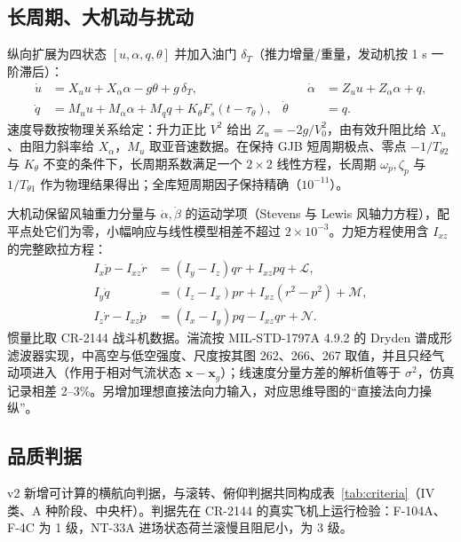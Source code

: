 \documentclass[UTF8,a4paper,11pt,fontset=fandol,scheme=plain]{ctexart}
\begin{document}
\subsection{长周期、大机动与扰动}
纵向扩展为四状态 \([u,\alpha,q,\theta]\) 并加入油门 \(\delta_T\)（推力增量/重量，发动机按 1 s 一阶滞后）：
\begin{equation}
\begin{aligned}
\dot u&=X_uu+X_\alpha\alpha-g\theta+g\,\delta_T, &\qquad \dot\alpha&=Z_uu+Z_\alpha\alpha+q,\\
\dot q&=M_uu+M_\alpha\alpha+M_qq+K_\theta F_s(t-\tau_\theta), & \dot\theta&=q .
\end{aligned}
\end{equation}
速度导数按物理关系给定：升力正比 \(V^2\) 给出 \(Z_u=-2g/V_0^2\)，由有效升阻比给 \(X_u\)、由阻力斜率给 \(X_\alpha\)，\(M_u\) 取亚音速数据。在保持 GJB 短周期极点、零点 \(-1/T_{\theta2}\) 与 \(K_\theta\) 不变的条件下，长周期系数满足一个 \(2\times2\) 线性方程，长周期 \(\omega_p,\zeta_p\) 与 \(1/T_{\theta1}\) 作为物理结果得出；全库短周期因子保持精确（\(10^{-11}\)）。

大机动保留风轴重力分量与 \(\dot\alpha,\dot\beta\) 的运动学项（Stevens 与 Lewis 风轴力方程），配平点处它们为零，小幅响应与线性模型相差不超过 \(2\times10^{-3}\)。力矩方程使用含 \(I_{xz}\) 的完整欧拉方程：
\begin{equation}
\begin{aligned}
I_x\dot p-I_{xz}\dot r&=(I_y-I_z)qr+I_{xz}pq+\mathcal L,\\
I_y\dot q&=(I_z-I_x)pr+I_{xz}(r^2-p^2)+\mathcal M,\\
I_z\dot r-I_{xz}\dot p&=(I_x-I_y)pq-I_{xz}qr+\mathcal N .
\end{aligned}
\end{equation}
惯量比取 CR-2144 战斗机数据。湍流按 MIL-STD-1797A 4.9.2 的 Dryden 谱成形滤波器实现，中高空与低空强度、尺度按其图 262、266、267 取值，并且只经气动项进入（作用于相对气流状态 \(\mathbf x-\mathbf x_g\)）；线速度分量方差的解析值等于 \(\sigma^2\)，仿真记录相差 2–3\%。另增加理想直接法向力输入，对应思维导图的“直接法向力操纵”。

\subsection{品质判据}
v2 新增可计算的横航向判据，与滚转、俯仰判据共同构成表~\ref{tab:criteria}（IV 类、A 种阶段、中央杆）。判据先在 CR-2144 的真实飞机上运行检验：F-104A、F-4C 为 1 级，NT-33A 进场状态荷兰滚慢且阻尼小，为 3 级。
\end{document}
